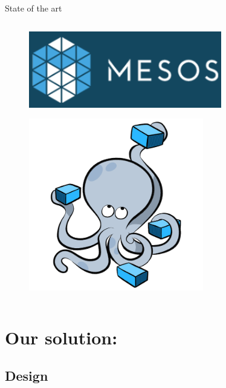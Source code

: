 \documentclass{beamer}
\begin{document}
\begin{frame}[t]{State of the art}
\begin{columns}[T]
\begin{column}{0.4\textwidth}
{\begin{figure}
          \end{figure}
          \vspace*{-1.7em}
          \begin{figure}
            \includegraphics[width=0.75\textwidth]{img/mesos_crop.png}
          \end{figure}
          \vspace*{-1.7em}
          \begin{figure}
            \includegraphics[width=0.68\textwidth]{img/docker_compose.png}
          \end{figure}
        }
      \end{column}
    \end{columns}
  \end{frame}


\section{Our solution: \dt}
\subsection*{Design}
\end{document}
